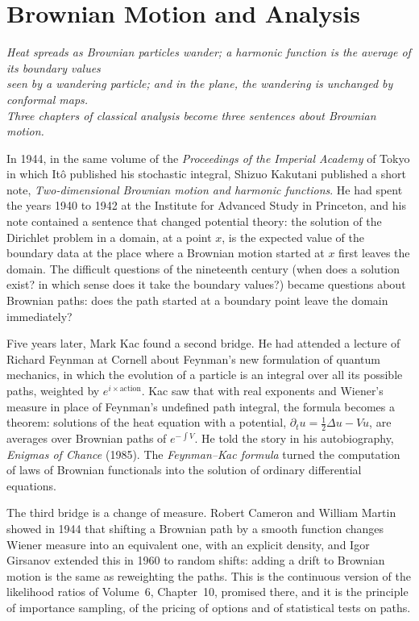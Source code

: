 \chapter{Brownian Motion and Analysis}

\begin{center}\itshape
Heat spreads as Brownian particles wander; a harmonic function is the average of its boundary values\\
seen by a wandering particle; and in the plane, the wandering is unchanged by conformal maps.\\
Three chapters of classical analysis become three sentences about Brownian motion.
\end{center}

In 1944, in the same volume of the \emph{Proceedings of the Imperial Academy} of Tokyo in which It\^o published his stochastic integral, Shizuo Kakutani published a short note,
\emph{Two-dimensional Brownian motion and harmonic functions}. He had spent the years 1940 to 1942 at the Institute for Advanced Study in Princeton, and his note contained a sentence that
changed potential theory: the solution of the Dirichlet problem in a domain, at a point $x$, is the expected value of the boundary data at the place where a Brownian motion started at $x$ first
leaves the domain. The difficult questions of the nineteenth century (when does a solution exist? in which sense does it take the boundary values?) became questions about Brownian paths:
does the path started at a boundary point leave the domain immediately?

Five years later, Mark Kac found a second bridge. He had attended a lecture of Richard Feynman at Cornell about Feynman's new formulation of quantum mechanics, in which the evolution of a particle
is an integral over all its possible paths, weighted by $e^{i\times\text{action}}$. Kac saw that with real exponents and Wiener's measure in place of Feynman's undefined path integral, the formula
becomes a theorem: solutions of the heat equation with a potential, $\partial_tu=\frac12\Delta u-Vu$, are averages over Brownian paths of $e^{-\int V}$. He told the story in his autobiography,
\emph{Enigmas of Chance} (1985). The \emph{Feynman--Kac formula} turned the computation of laws of Brownian functionals into the solution of ordinary differential equations.

The third bridge is a change of measure. Robert Cameron and William Martin showed in 1944 that shifting a Brownian path by a smooth function changes Wiener measure into an equivalent one, with an
explicit density, and Igor Girsanov extended this in 1960 to random shifts: adding a drift to Brownian motion is the same as reweighting the paths. This is the continuous version of the likelihood
ratios of Volume~6, Chapter~10, promised there, and it is the principle of importance sampling, of the pricing of options and of statistical tests on paths.

